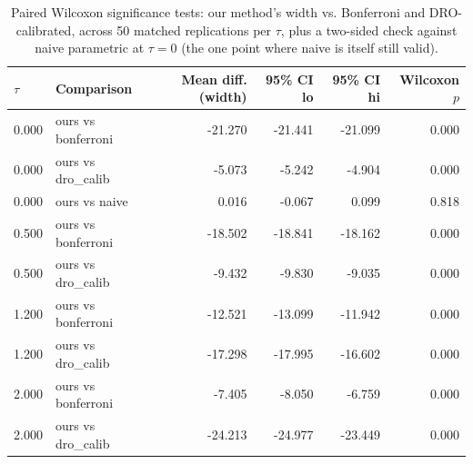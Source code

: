 \begin{table}[htbp]
\centering
\caption{Paired Wilcoxon significance tests: our method's width vs. Bonferroni and DRO-calibrated, across 50 matched replications per $\tau$, plus a two-sided check against naive parametric at $\tau=0$ (the one point where naive is itself still valid).}
\label{tab:width-tests}
\begin{tabular}{llrrrr}
\toprule
$\tau$ & Comparison & Mean diff. (width) & 95\% CI lo & 95\% CI hi & Wilcoxon $p$ \\
\midrule
0.000 & ours vs bonferroni & -21.270 & -21.441 & -21.099 & 0.000 \\
0.000 & ours vs dro\_calib & -5.073 & -5.242 & -4.904 & 0.000 \\
0.000 & ours vs naive & 0.016 & -0.067 & 0.099 & 0.818 \\
0.500 & ours vs bonferroni & -18.502 & -18.841 & -18.162 & 0.000 \\
0.500 & ours vs dro\_calib & -9.432 & -9.830 & -9.035 & 0.000 \\
1.200 & ours vs bonferroni & -12.521 & -13.099 & -11.942 & 0.000 \\
1.200 & ours vs dro\_calib & -17.298 & -17.995 & -16.602 & 0.000 \\
2.000 & ours vs bonferroni & -7.405 & -8.050 & -6.759 & 0.000 \\
2.000 & ours vs dro\_calib & -24.213 & -24.977 & -23.449 & 0.000 \\
\bottomrule
\end{tabular}
\end{table}
